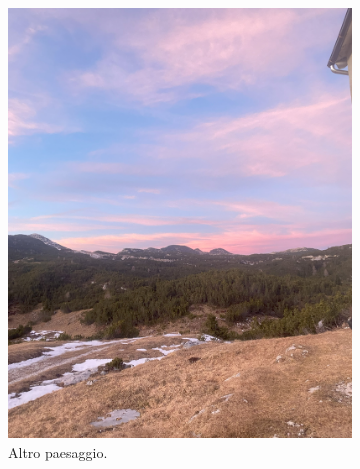 \documentclass{article}
\begin{document}
\begin{figure}[H]
    \centering
    \begin{subfigure}[b]{0.45\textwidth}
        \includegraphics[width=\textwidth]{images/foto_bivacco.jpg}
        \caption{Altro paesaggio.}
    \end{subfigure}
    \hfill
    \begin{subfigure}[b]{0.45\textwidth}

\end{subfigure}
\end{figure}
\end{document}
